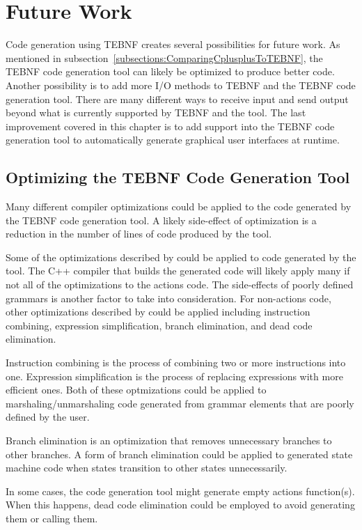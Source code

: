 \chapter{Future Work}
Code generation using TEBNF creates several possibilities for future work.  As mentioned in subsection~\ref{subsections:ComparingCplusplusToTEBNF}, the TEBNF code generation tool can likely be optimized to produce better code.  Another possibility is to add more I/O methods to TEBNF and the TEBNF code generation tool.  There are many different ways to receive input and send output beyond what is currently supported by TEBNF and the tool.  The last improvement covered in this chapter is to add support into the TEBNF code generation tool to automatically generate graphical user interfaces at runtime.

\section{Optimizing the TEBNF Code Generation Tool}
Many different compiler optimizations could be applied to the code generated by the TEBNF code generation tool.  A likely side-effect of optimization is a reduction in the number of lines of code produced by the tool.

\indent
Some of the optimizations described by \cite{optimizations_01} could be applied to code generated by the tool.  The C++ compiler that builds the generated code will likely apply many if not all of the optimizations to the actions code.   The side-effects of poorly defined grammars is another factor to take into consideration.  For non-actions code, other optimizations described by \cite{optimizations_01} could be applied including instruction combining, expression simplification, branch elimination, and dead code elimination.

\indent
Instruction combining is the process of combining two or more instructions into one.  Expression simplification is the process of replacing expressions with more efficient ones.  Both of these optmizations could be applied to marshaling/unmarshaling code generated from grammar elements that are poorly defined by the user.

\indent
Branch elimination is an optimization that removes unnecessary branches to other branches.  A form of branch elimination could be applied to generated state machine code when states transition to other states unnecessarily.

\indent
In some cases, the code generation tool might generate empty actions function(s).
When this happens, dead code elimination could be employed to avoid generating them or calling them.

